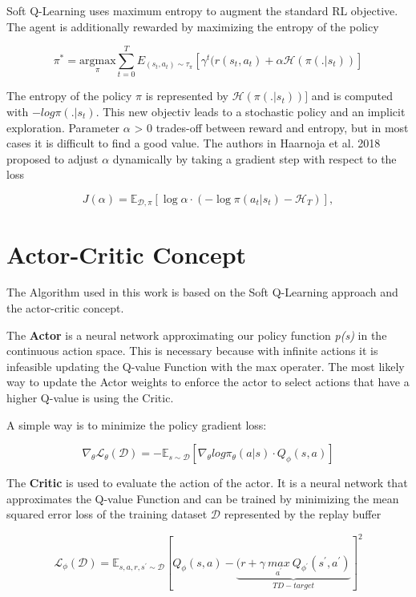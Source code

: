 Soft Q-Learning uses maximum entropy to augment the standard RL objective.
The agent is additionally rewarded by maximizing the entropy of the policy

\begin{equation}
  \pi^* = \underset{\pi}{\mathrm{argmax}} \sum_{t=0}^{T} E_{(s_t, a_t) \sim \tau_{\pi}}[\gamma^t (r(s_t, a_t) + \alpha \mathcal{H}(\pi(.|s_t))]
\end{equation}

The entropy of the policy $\pi$ is represented by $\mathcal{H}(\pi(.|s_t))]$ and is computed with $-log\pi(.|s_t)$.
This new objectiv leads to a stochastic policy and an implicit exploration.
Parameter $\alpha$ > 0 trades-off between reward and entropy,
but in most cases it is difficult to find a good value.
The authors in Haarnoja et al. 2018 \cite{haarnoja2018soft} 
proposed to adjust $\alpha$ dynamically by taking a gradient step with respect to the loss 

\begin{equation}\label{eq:entropy_temp}
J(\alpha)= \mathbb{E}_{\mathcal{D}, \pi}
\left[
    \log \alpha \cdot  (
        -\log \pi( a_{t} | s_{t} )
        -
        \mathcal{H}_T
    )
\right],
\end{equation}


\section{Actor-Critic Concept}

The Algorithm used in this work is based on the Soft Q-Learning approach and the actor-critic concept.

The \textbf{Actor} is a neural network  approximating our policy function \textit{p(s)} in the continuous action space.  
This is necessary because with infinite actions it is infeasible updating the Q-value Function with the max operater. The most likely way to update the 
Actor weights to enforce the actor to select actions that have a higher Q-value is using the Critic.

A simple way is to minimize the policy gradient loss:

\begin{equation}
  \nabla_{\theta} \mathcal{L}_{\theta}(\mathcal{D}) = - \mathbb{E}_{s \sim \mathcal{D}} [\nabla_{\theta} log \pi_{\theta}(a|s) \cdot Q_{\phi}(s,a)]
\end{equation}


The \textbf{Critic} is used to evaluate the action of the actor. It is a neural network that approximates the Q-value Function and can be trained by minimizing the mean squared error loss
of the training dataset $\mathcal{D}$ represented by the replay buffer

\begin{equation}
  \mathcal{L}_{\phi}(\mathcal{D}) =  \mathbb{E}_{s,a, r, s^{\prime} \sim \mathcal{D}} [Q_{\phi}(s,a) - \underbrace{( r + \gamma \: \underset{a^{\prime}}{max} \:  Q_{\phi^{\prime}}(s^{\prime},a^{\prime})}_{TD - target}]^{2}
\end{equation}
